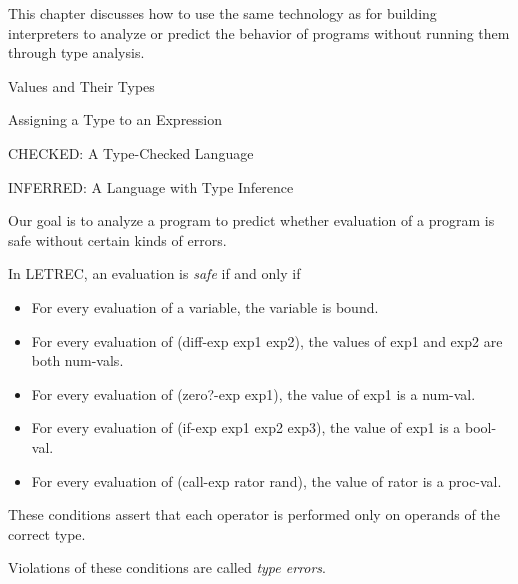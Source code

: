 \documentclass{article}
\begin{document}
\begin{huge}

\sf


This chapter discusses how to use the same technology as for building interpreters to analyze or predict the behavior of 
programs without running them through type analysis.

\blob Values and Their Types

\blob Assigning a Type to an Expression

\blob CHECKED: A Type-Checked Language

\blob INFERRED: A Language with Type Inference


Our goal is to analyze a program to predict whether evaluation of a program is safe without certain kinds of errors.

In LETREC, an evaluation is {\it safe} if and only if
\begin{itemize}
\item For every evaluation of a variable, the variable is bound.
\item For every evaluation of (diff-exp exp1 exp2), the values of exp1 and exp2 are both num-vals.
\item For every evaluation of (zero?-exp exp1), the value of exp1 is a num-val.
\item For every evaluation of (if-exp exp1 exp2 exp3), the value of exp1 is a bool-val.
\item For every evaluation of (call-exp rator rand), the value of rator is a proc-val.
\end{itemize}


These conditions assert that each operator is performed only on operands of the correct type. 

Violations of these conditions are called {\it type errors}.


\end{huge}
\end{document}

